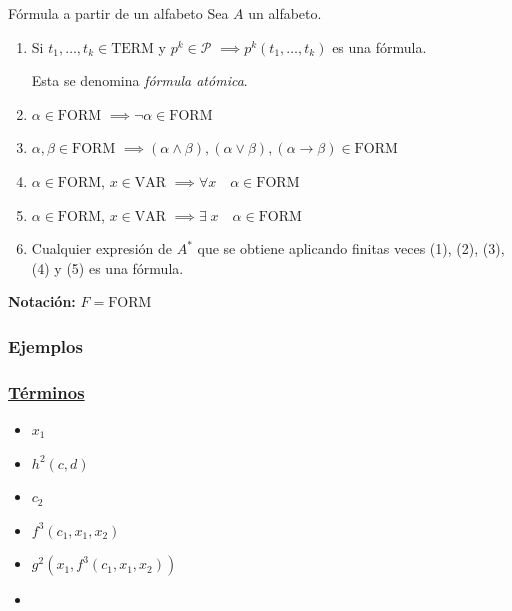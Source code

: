 \begin{definicion}{Fórmula a partir de un alfabeto}{}
    Sea $A$ un alfabeto.

    \medskip

    \begin{enumerate}
        \item Si $t_1, \dotsc, t_k \in  \mathrm{TERM}$ 
            y $p^{k} \in \mathcal{P}$
                $\implies p^{k}(t_1, \dotsc, t_k)$ es una fórmula.

            Esta se denomina \textit{fórmula atómica}.
        \item $\alpha \in \mathrm{FORM}$
            $\implies \neg \alpha \in \mathrm{FORM}$

        \item $\alpha, \beta \in \mathrm{FORM}$
            $\implies (\alpha\wedge\beta),(\alpha\vee\beta),
            (\alpha\to\beta) \in \mathrm{FORM}$
        \item $\alpha \in \mathrm{FORM}$, $x \in \mathrm{VAR}$
            $\implies \forall x \quad \alpha \in \mathrm{FORM}$
        \item $\alpha \in \mathrm{FORM}$, $x \in \mathrm{VAR}$
            $\implies \exists\; x \quad \alpha \in \mathrm{FORM}$
        \item Cualquier expresión de $A^{*}$ que se obtiene aplicando
            finitas veces (1), (2), (3), (4) y (5) es una fórmula.
    \end{enumerate}

    \bigskip
    \textbf{Notación:}
    $F = \mathrm{FORM}$
\end{definicion}

\subsubsection{Ejemplos}

\subsubsection{\underline{Términos}}

\begin{multicols}{2}
    \begin{itemize}
            \item $x_1$
            \item $h^{2}(c,d)$ %
            \item $c_2$
            \item $f^{3} (c_1, x_1, x_2)$
            \item $g^{2}(x_1, f^{3}(c_1, x_1, x_2))$
            \item[\vspace{\fill}]
    \end{itemize}
\end{multicols}


